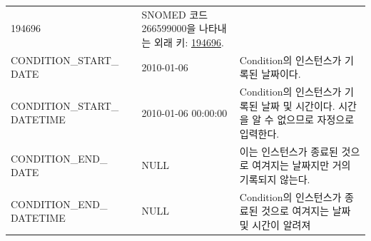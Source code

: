 \documentclass[11pt]{book}
\theoremstyle{definition}
\theoremstyle{definition}
\theoremstyle{definition}
\theoremstyle{remark}
\begin{document}
\begin{longtable}[]{@{}lll@{}}
\begin{minipage}[t]{0.16\columnwidth}
194696\strut
\end{minipage} & \begin{minipage}[t]{0.48\columnwidth}\raggedright\strut
SNOMED 코드 266599000을 나타내는 외래 키:
\href{http://athena.ohdsi.org/search-terms/terms/194696}{194696}.\strut
\end{minipage}\tabularnewline
\begin{minipage}[t]{0.28\columnwidth}\raggedright\strut
CONDITION\_START\_ DATE\strut
\end{minipage} & \begin{minipage}[t]{0.16\columnwidth}\raggedright\strut
2010-01-06\strut
\end{minipage} & \begin{minipage}[t]{0.48\columnwidth}\raggedright\strut
Condition의 인스턴스가 기록된 날짜이다.\strut
\end{minipage}\tabularnewline
\begin{minipage}[t]{0.28\columnwidth}\raggedright\strut
CONDITION\_START\_ DATETIME\strut
\end{minipage} & \begin{minipage}[t]{0.16\columnwidth}\raggedright\strut
2010-01-06 00:00:00\strut
\end{minipage} & \begin{minipage}[t]{0.48\columnwidth}\raggedright\strut
Condition의 인스턴스가 기록된 날짜 및 시간이다. 시간을 알 수 없으므로
자정으로 입력한다.\strut
\end{minipage}\tabularnewline
\begin{minipage}[t]{0.28\columnwidth}\raggedright\strut
CONDITION\_END\_ DATE\strut
\end{minipage} & \begin{minipage}[t]{0.16\columnwidth}\raggedright\strut
NULL\strut
\end{minipage} & \begin{minipage}[t]{0.48\columnwidth}\raggedright\strut
이는 인스턴스가 종료된 것으로 여겨지는 날짜지만 거의 기록되지
않는다.\strut
\end{minipage}\tabularnewline
\begin{minipage}[t]{0.28\columnwidth}\raggedright\strut
CONDITION\_END\_ DATETIME\strut
\end{minipage} & \begin{minipage}[t]{0.16\columnwidth}\raggedright\strut
NULL\strut
\end{minipage} & \begin{minipage}[t]{0.48\columnwidth}\raggedright\strut
Condition의 인스턴스가 종료된 것으로 여겨지는 날짜 및 시간이 알려져

\end{minipage}
\end{longtable}
\end{document}
